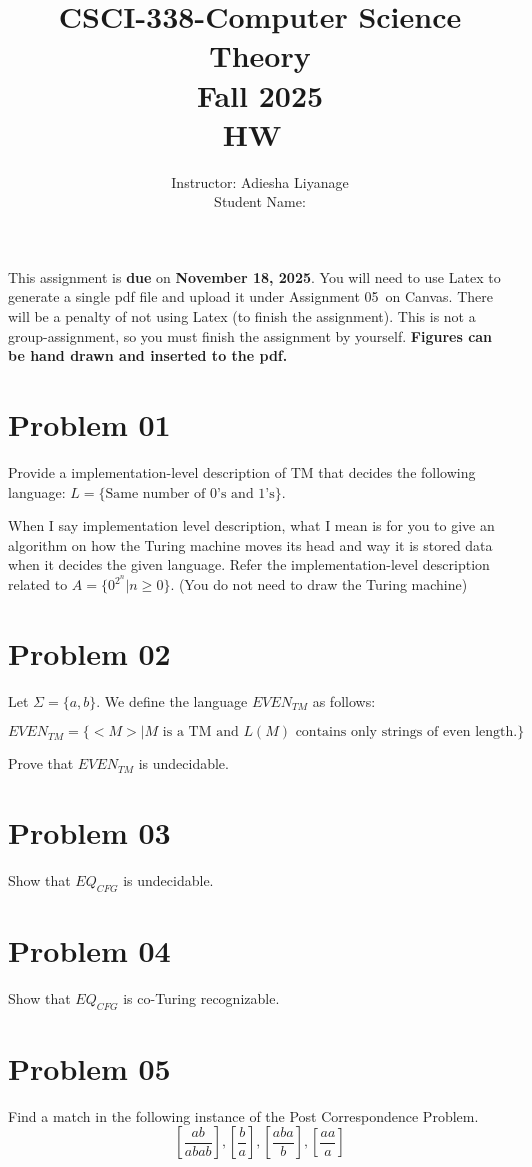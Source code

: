 \documentclass{article}
\title{CSCI-338-Computer Science Theory\\Fall 2025 \\HW~\assignmentnumber}
\author{Instructor: Adiesha Liyanage \\
Student Name: }
\date{}
\newcommand{\assignmentnumber}{05~}
\newcommand{\assignmentduedate}{November 18, 2025}
\begin{document}
\maketitle
This assignment is \textbf{due} on \textbf{\assignmentduedate}. You will need to use Latex to generate a single pdf file and upload it under Assignment \assignmentnumber on Canvas. There will be a penalty of not using Latex (to finish the assignment). This is not a group-assignment, so you must finish the assignment by yourself. \textbf{Figures can be hand drawn and inserted to the pdf.}


\section{Problem 01}
\noindent
Provide a implementation-level description of TM that decides the following language: \(L = \{\text{Same number of 0's and 1's}\}\). 

When I say implementation level description, what I mean is for you to give an algorithm on how the Turing machine moves its head and way it is stored data when it decides the given language. Refer the implementation-level description  related to \(A = \{0^{2^n}| n \geq 0\}\). (You do not need to draw the Turing machine)

\section{Problem 02}
Let \(\Sigma = \{a, b\}\). We define the language \(EVEN_{TM}\) as follows:

\[EVEN_{TM} = \{<M> | M \text{ is a TM and } L(M) \text{ contains only strings of even length.}\}\]

Prove that \(EVEN_{TM}\) is undecidable.

\section{Problem 03}
Show that \(EQ_{CFG}\) is undecidable.

\section{Problem 04}
Show that \(EQ_{CFG}\) is co-Turing recognizable. 


\section{Problem 05}
Find a match in the following instance of the Post Correspondence Problem.
\[\left[ \frac{ab}{abab} \right], \left[ \frac{b}{a} \right], \left[ \frac{aba}{b} \right], \left[ \frac{aa}{a} \right]\]
\end{document}
